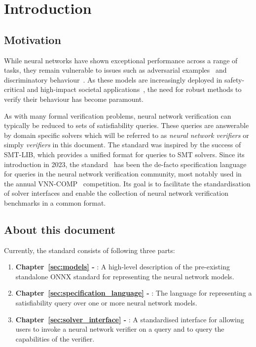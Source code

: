 \chapter{Introduction}
\label{sec:intro}

\section{Motivation}

While neural networks have shown exceptional performance across a range of tasks, 
they remain vulnerable to issues such as adversarial examples~\cite{szegedy2013intriguing} and discriminatory behaviour~\cite{4}. As these models are increasingly deployed in safety-critical and high-impact societal applications~\cite{1,2,3}, the need for robust methods to verify their behaviour has become paramount.

As with many formal verification problems, neural network verification can typically be reduced to sets of satisfiability queries. These queries are answerable by domain specific solvers which will be referred to as \emph{neural network verifiers} or simply \emph{verifiers} in this document. The \vnnlib{} standard was inspired by the success of SMT-LIB, which provides a unified format for queries to SMT solvers. 
Since its introduction in 2023, the \vnnlib{} standard~\cite{5} has been the de-facto specification language for queries in the neural network verification community, most notably used in the annual VNN-COMP~\cite{7} competition. Its goal is to facilitate the standardisation of solver interfaces and enable the collection of neural network verification benchmarks in a common format. 

\section{About this document}

Currently, the standard consists of following three parts:
\begin{enumerate}
\item \textbf{Chapter~\ref{sec:models} - }: A high-level description of the pre-existing standalone ONNX standard for representing the neural network models.
\item \textbf{Chapter~\ref{sec:specification_language} - }: The \vnnlib{} language for representing a satisfiability query over one or more neural network models.
\item \textbf{Chapter~\ref{sec:solver_interface} - }: A standardised interface for allowing users to invoke a neural network verifier on a query and to query the capabilities of the verifier.
\end{enumerate}

